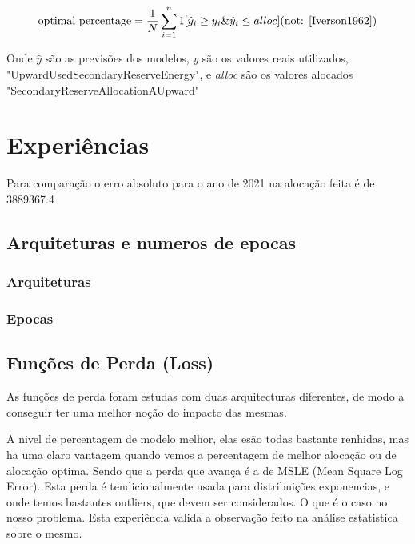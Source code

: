 \begin{equation} 
    \label{eq:eq1} 
    \text{optimal percentage} = \frac{1}{N} \sum_{i=1}^{n} 1 [\hat{y}_i \geq y_i  \&  \hat{y}_i \leq alloc]
    \text{(not: \cite{Iverson1962})}
\end{equation}


Onde \textit{$\hat{y}$} são as previsões dos modelos, \textit{y} são os valores reais utilizados, "UpwardUsedSecondaryReserveEnergy", e \textit{alloc} são os valores alocados "SecondaryReserveAllocationAUpward"


\section{Experiências\label{se:experiments}}

Para comparação o erro absoluto para o ano de 2021 na alocação feita é de 3889367.4

\subsection{Arquiteturas e numeros de epocas\label{se:archs_epocs}}

\subsubsection{Arquiteturas\label{se:archs_res}}



\resizebox{\linewidth}{!}{}

\subsubsection{Epocas\label{se:epocas_res}}

\subsection{Funções de Perda (Loss) \label{se:loss_exp}}

As funções de perda foram estudas com duas arquitecturas diferentes, de modo a conseguir ter uma melhor noção do impacto das mesmas.

\resizebox{\linewidth}{!}{}

A nivel de percentagem de modelo melhor, elas esão todas bastante renhidas, mas ha uma claro vantagem quando vemos a percentagem de melhor alocação ou de alocação optima.
Sendo que a perda que avança é a de MSLE (Mean Square Log Error).
Esta perda é tendicionalmente usada para distribuições exponencias, e onde temos bastantes outliers, que devem ser considerados. O que é o caso no nosso problema.
Esta experiência valida a observação feito na análise estatistica sobre o mesmo.

